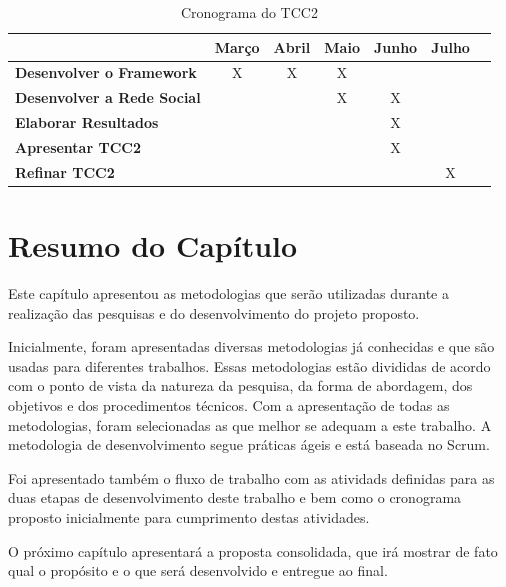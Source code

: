 \begin{table}[h]
\centering
\caption{Cronograma do TCC2}
\label{cronograma tcc2}
\begin{tabular}{|l|c|c|c|c|c|c|}
\hline
                                      			& \multicolumn{1}{l|}{\textbf{Março}} & \multicolumn{1}{l|}{\textbf{Abril}} & \multicolumn{1}{l|}{\textbf{Maio}} & \multicolumn{1}{l|}{\textbf{Junho}} & \multicolumn{1}{l|}{\textbf{Julho}} \\ \hline
\textbf{Desenvolver o Framework}                & X                           		  & X                              		& X                            		 &                               	   &                               		 \\ \hline
\textbf{Desenvolver a Rede Social}              &                            		  &                               		& X                            		 & X                              	   &                               		 \\ \hline
\textbf{Elaborar Resultados}				    &                            		  &                              		&                             		 & X                             	   &                               		 \\ \hline
\textbf{Apresentar TCC2}						&                             		  &                              		&                             		 & X                              	   &                               		 \\ \hline
\textbf{Refinar TCC2}				            &                             		  &                               		&                             		 &                               	   & X                             		 \\ \hline
\end{tabular}
\end{table}

\section{Resumo do Capítulo}

Este capítulo apresentou as metodologias que serão utilizadas durante a realização das pesquisas e do desenvolvimento do projeto proposto.

Inicialmente, foram apresentadas diversas metodologias já conhecidas e que são usadas para diferentes trabalhos. Essas metodologias estão divididas de acordo com o ponto de vista da natureza da pesquisa, da forma de abordagem, dos objetivos e dos procedimentos técnicos. Com a apresentação de todas as metodologias, foram selecionadas as que melhor se adequam a este trabalho. A metodologia de desenvolvimento segue práticas ágeis e está baseada no Scrum.

Foi apresentado também o fluxo de trabalho com as atividads definidas para as duas etapas de desenvolvimento deste trabalho e bem como o cronograma proposto inicialmente para cumprimento destas atividades.

O próximo capítulo apresentará a proposta consolidada, que irá mostrar de fato qual o propósito e o que será desenvolvido e entregue ao final.
